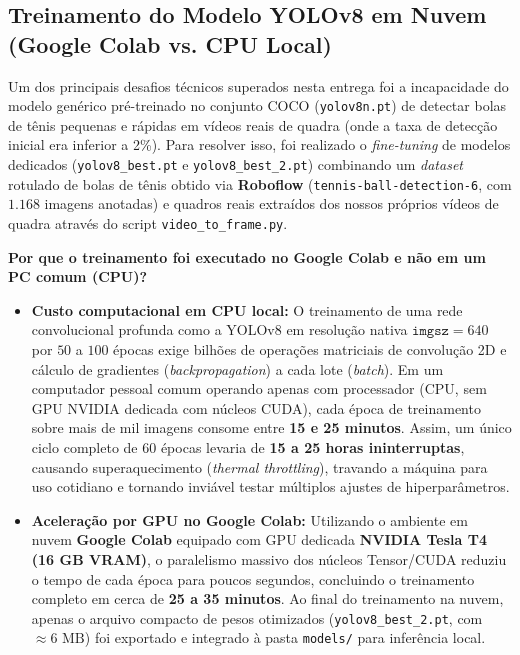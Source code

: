 \documentclass[a4paper,11pt]{article}
\begin{document}
\subsection{Treinamento do Modelo YOLOv8 em Nuvem (Google Colab vs. CPU Local)}
Um dos principais desafios técnicos superados nesta entrega foi a incapacidade do modelo genérico pré-treinado no conjunto COCO (\texttt{yolov8n.pt}) de detectar bolas de tênis pequenas e rápidas em vídeos reais de quadra (onde a taxa de detecção inicial era inferior a 2\%). Para resolver isso, foi realizado o \textit{fine-tuning} de modelos dedicados (\texttt{yolov8\_best.pt} e \texttt{yolov8\_best\_2.pt}) combinando um \textit{dataset} rotulado de bolas de tênis obtido via \textbf{Roboflow} (\texttt{tennis-ball-detection-6}, com $1.168$ imagens anotadas) e quadros reais extraídos dos nossos próprios vídeos de quadra através do script \texttt{video\_to\_frame.py}.

\textbf{Por que o treinamento foi executado no Google Colab e não em um PC comum (CPU)?}
\begin{itemize}[nosep]
  \item \textbf{Custo computacional em CPU local:} O treinamento de uma rede convolucional profunda como a YOLOv8 em resolução nativa $\texttt{imgsz}=640$ por $50$ a $100$ épocas exige bilhões de operações matriciais de convolução 2D e cálculo de gradientes (\textit{backpropagation}) a cada lote (\textit{batch}). Em um computador pessoal comum operando apenas com processador (CPU, sem GPU NVIDIA dedicada com núcleos CUDA), cada época de treinamento sobre mais de mil imagens consome entre \textbf{15 e 25 minutos}. Assim, um único ciclo completo de $60$ épocas levaria de \textbf{15 a 25 horas ininterruptas}, causando superaquecimento (\textit{thermal throttling}), travando a máquina para uso cotidiano e tornando inviável testar múltiplos ajustes de hiperparâmetros.
  \item \textbf{Aceleração por GPU no Google Colab:} Utilizando o ambiente em nuvem \textbf{Google Colab} equipado com GPU dedicada \textbf{NVIDIA Tesla T4 (16 GB VRAM)}, o paralelismo massivo dos núcleos Tensor/CUDA reduziu o tempo de cada época para poucos segundos, concluindo o treinamento completo em cerca de \textbf{25 a 35 minutos}. Ao final do treinamento na nuvem, apenas o arquivo compacto de pesos otimizados (\texttt{yolov8\_best\_2.pt}, com $\approx 6\text{ MB}$) foi exportado e integrado à pasta \texttt{models/} para inferência local.
\end{itemize}
\end{document}
